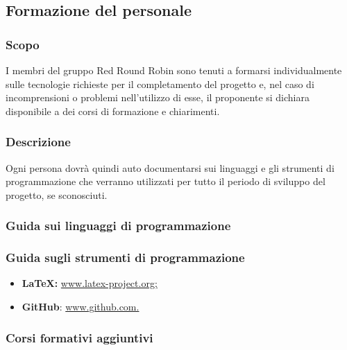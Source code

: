 \subsection{Formazione del personale}

	\subsubsection{Scopo}
		I membri del gruppo Red Round Robin sono tenuti a formarsi individualmente sulle tecnologie richieste per il completamento del progetto e, nel caso di incomprensioni o problemi nell'utilizzo di esse, il proponente si dichiara disponibile a dei corsi di formazione e chiarimenti.
	\subsubsection{Descrizione}
		Ogni persona dovrà quindi auto documentarsi sui linguaggi e gli strumenti di programmazione che verranno utilizzati per tutto il periodo di sviluppo del progetto, se sconosciuti.
	\subsubsection{Guida sui linguaggi di programmazione}
	
	\subsubsection{Guida sugli strumenti di programmazione}
		\begin{itemize}
			\item \textbf{\LaTeX{}:} \href{www.latex-project.org}{www.latex-project.org;}
			\item \textbf{GitHub}: \href{www.github.com}{www.github.com.}
		\end{itemize}
	\subsubsection{Corsi formativi aggiuntivi}
